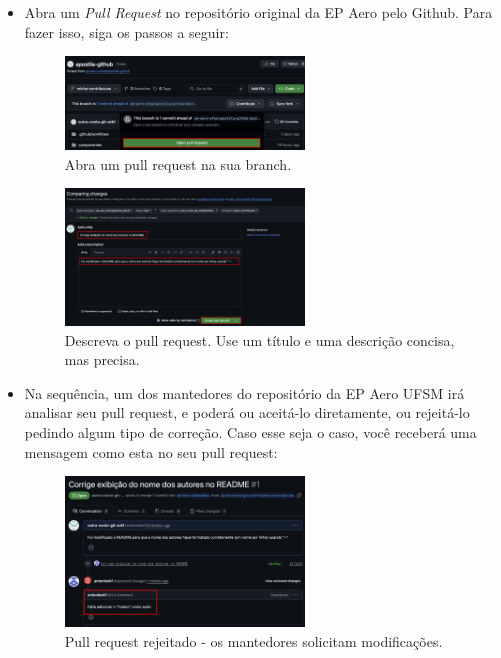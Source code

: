 \begin{itemize}
        \item Abra um \textit{Pull Request} no repositório original da EP Aero pelo Github. Para fazer isso, siga os passos a seguir:

    \begin{figure}[H]
        \centering
        \includegraphics[width=0.6\textwidth]{imgs/tutorial_contribuicao/abrir_pull_request.png}
        \caption{Abra um pull request na sua branch.}
        \label{fig:abrir_pr}
    \end{figure}

    \begin{figure}[H]
        \centering
        \includegraphics[width=0.6\textwidth]{imgs/tutorial_contribuicao/configurando_pull_request.png}
        \caption{Descreva o pull request. Use um título e uma descrição concisa, mas precisa.}
        \label{fig:configurar_pr}
    \end{figure}

    \item Na sequência, um dos mantedores do repositório da EP Aero UFSM irá analisar seu pull request, e poderá ou aceitá-lo diretamente, ou rejeitá-lo pedindo algum tipo de correção. Caso esse seja o caso, você receberá uma mensagem como esta no seu pull request:

    \begin{figure}[H]
        \centering
        \includegraphics[width=0.6\textwidth]{imgs/tutorial_contribuicao/pr_rejeitado.png}
        \caption{Pull request rejeitado - os mantedores solicitam modificações.}
        \label{fig:pr_rejeitado}
    \end{figure}


\end{itemize}
